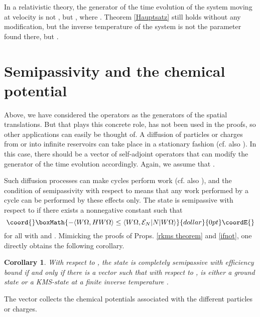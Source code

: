 \documentclass[a4paper,11pt]{article}
\newtheorem{corollary}[theorem]{Corollary}{\bf}{\it}
\def\dt{\cal}
\def\dM{{\dt M}}
\def\E{{\cal E}}
\def\gO{\Omega}
\def\go{\omega}
\begin{document}
In a relativistic theory,
the generator of the time evolution of the system moving at
velocity \coordHE{} is not \coordHE{}, but
\coordHE{},
where \coordHE{}. Theorem
\ref{Hauptsatz} still holds without any modification, but the
inverse temperature of the system is not the
parameter \myHighlight{$\beta$}\coordHE{} found there, but
\myHighlight{$\beta/\gamma$}\coordHE{}.

\section{Semipassivity and the chemical potential}\label{chemical potential}
Above, we have considered the operators \coordHE{} as the generators
of the spatial translations.
But that \coordHE{} plays this concrete role,
has not been used in the proofs, so
other applications can easily be thought of. A
diffusion of particles or charges from or into infinite reservoirs
can take place in a stationary fashion (cf. also \cite{Rue00,GL00,
AHKT,Haa92,Kas76}). In this case, there should be
a vector \coordHE{} of self-adjoint
operators that can modify the generator of the time evolution
accordingly. Again, we assume that \myHighlight{$N_1\gO=\dots=N_n\gO=0$}\coordHE{}.

Such diffusion processes can make cycles perform work
(cf. also \cite{Nar82}), and the condition
of semipassivity with respect to \coordHE{}
means that any work performed by a cycle
can be performed by these effects only. The state \myHighlight{$\go$}\coordHE{} is
semipassive with respect to \coordHE{} if there exists a nonnegative constant
\myHighlight{$\E_N$}\coordHE{} such that
$$\coord{}\boxMath{-\langle W\gO,HW\gO\rangle\leq\langle W\gO,\E_N|N|W\gO\rangle}{dollar}{0pt}\coordE{}$$
for all \myHighlight{$W\in U_1(\dM)$}\coordHE{} with \myHighlight{$[H,W]\in\dM$}\coordHE{} and \myHighlight{$[N,W]\in\dM$}\coordHE{}.
Mimicking the proofs of Props. \ref{rkms theorem} and \ref{ifnot},
one directly obtains the following corollary.
\begin{corollary}
With respect to \coordHE{},
the state \myHighlight{$\go$}\coordHE{} is completely semipassive with efficiency bound
\myHighlight{$\E_N$}\coordHE{} if and only if there is a vector
\coordHE{} such that with respect to \coordHE{},
\myHighlight{$\go$}\coordHE{} is either a ground state or
a KMS-state at a finite inverse temperature
\coordHE{}.
\end{corollary}
The vector \myHighlight{$\mu$}\coordHE{} collects the chemical potentials associated with
the different particles or charges.
\end{document}
